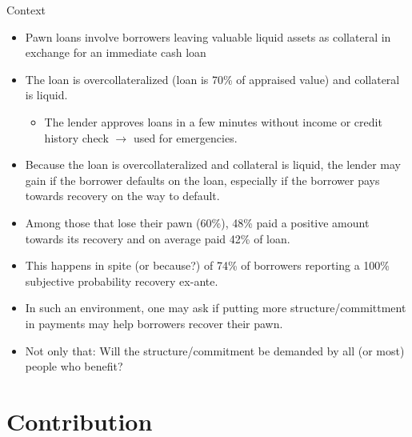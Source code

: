\documentclass[8pt]{beamer}
\begin{document}
\begin{frame}{Context}
\begin{itemize}
    \vfill \item Pawn loans involve borrowers leaving valuable liquid assets as collateral in exchange for an immediate cash loan
    \vfill \pause \item The loan is overcollateralized (loan is 70\% of appraised value) and collateral is liquid.
    \begin{itemize}
        \item The lender approves loans in a few minutes without income or credit history check $\rightarrow$ used for emergencies.
    \end{itemize}
  \vfill \pause \item Because the loan is overcollateralized and collateral is liquid, the lender may gain if the borrower defaults on the loan, especially if the borrower pays towards recovery on the way to default.
    \vfill \pause  \item Among those that lose their pawn (60\%), 48\% paid a positive amount towards its recovery and on average paid 42\% of loan.
    \vfill      \item This happens in spite (or because?) of 74\% of borrowers reporting a 100\% subjective probability recovery ex-ante. 
     \vfill \pause    \item In such an environment, one may ask if putting more structure/committment in payments may help borrowers recover their pawn.
     \vfill \pause    \item Not only that: Will the structure/commitment be demanded by all (or most) people who benefit?
        

\end{itemize}
\end{frame}





\section{Contribution}
\end{document}
